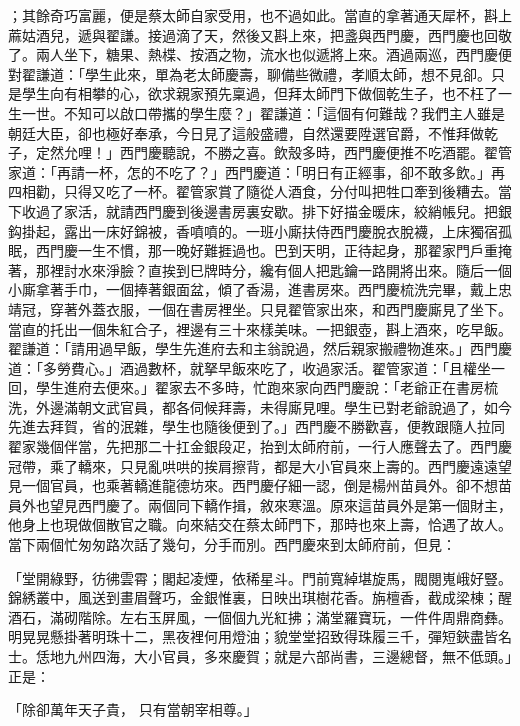 ；其餘奇巧富麗，便是蔡太師自家受用，也不過如此。當直的拿著通天犀杯，斟上蔴姑酒兒，遞與翟謙。接過滴了天，然後又斟上來，把盞與西門慶，西門慶也回敬了。兩人坐下，糖果、熱楪、按酒之物，流水也似遞將上來。酒過兩巡，西門慶便對翟謙道：「學生此來，單為老太師慶壽，聊備些微禮，孝順太師，想不見卻。只是學生向有相攀的心，欲求親家預先稟過，但拜太師門下做個乾生子，也不枉了一生一世。不知可以啟口帶攜的學生麼？」翟謙道：「這個有何難哉？我們主人雖是朝廷大臣，卻也極好奉承，今日見了這般盛禮，自然還要陞選官爵，不惟拜做乾子，定然允哩！」西門慶聽說，不勝之喜。飲殼多時，西門慶便推不吃酒罷。翟管家道：「再請一杯，怎的不吃了？」西門慶道：「明日有正經事，卻不敢多飲。」再四相勸，只得又吃了一杯。翟管家賞了隨從人酒食，分付叫把牲口牽到後糟去。當下收過了家活，就請西門慶到後邊書房裏安歇。排下好描金暖床，絞綃帳兒。把銀鈎掛起，露出一床好錦被，香噴噴的。一班小廝扶侍西門慶脫衣脫襪，上床獨宿孤眠，西門慶一生不慣，那一晚好難捱過也。巴到天明，正待起身，那翟家門戶重掩著，那裡討水來淨臉？直挨到巳牌時分，纔有個人把匙鑰一路開將出來。隨后一個小廝拿著手巾，一個捧著銀面盆，傾了香湯，進書房來。西門慶梳洗完畢，戴上忠靖冠，穿著外蓋衣服，一個在書房裡坐。只見翟管家出來，和西門慶廝見了坐下。當直的托出一個朱紅合子，裡邊有三十來樣美味。一把銀壺，斟上酒來，吃早飯。翟謙道：「請用過早飯，學生先進府去和主翁說過，然后親家搬禮物進來。」西門慶道：「多勞費心。」酒過數杯，就拏早飯來吃了，收過家活。翟管家道：「且權坐一回，學生進府去便來。」翟家去不多時，忙跑來家向西門慶說：「老爺正在書房梳洗，外邊滿朝文武官員，都各伺候拜壽，未得廝見哩。學生已對老爺說過了，如今先進去拜賀，省的泯雜，學生也隨後便到了。」西門慶不勝歡喜，便教跟隨人拉同翟家幾個伴當，先把那二十扛金銀段疋，抬到太師府前，一行人應聲去了。西門慶冠帶，乘了轎來，只見亂哄哄的挨肩擦背，都是大小官員來上壽的。西門慶遠遠望見一個官員，也乘著轎進龍德坊來。西門慶仔細一認，倒是楊州苗員外。卻不想苗員外也望見西門慶了。兩個同下轎作揖，敘來寒溫。原來這苗員外是第一個財主，他身上也現做個散官之職。向來結交在蔡太師門下，那時也來上壽，恰遇了故人。當下兩個忙匆匆路次話了幾句，分手而別。西門慶來到太師府前，但見：

「堂開綠野，彷彿雲霄；閣起凌煙，依稀星斗。門前寬綽堪旋馬，閥閱嵬峨好豎。錦綉叢中，風送到畫眉聲巧，金銀惟裏，日映出琪樹花香。旃檀香，截成梁棟；醒酒石，滿砌階除。左右玉屏風，一個個九光紅拂；滿堂羅寶玩，一件件周鼎商彝。明晃晃懸掛著明珠十二，黑夜裡何用燈油；貌堂堂招致得珠履三千，彈短鋏盡皆名士。恁地九州四海，大小官員，多來慶賀；就是六部尚書，三邊總督，無不低頭。」正是：

「除卻萬年天子貴，  只有當朝宰相尊。」

